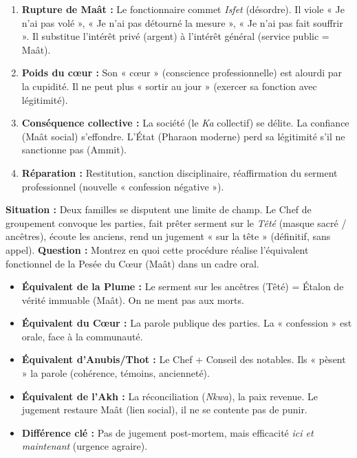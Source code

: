 \documentclass[11pt]{article}
\begin{document}
\begin{corrige}[Exercice 1]
\begin{enumerate}
    \item \textbf{Rupture de Maât :} Le fonctionnaire commet \textit{Isfet} (désordre). Il viole « Je n'ai pas volé », « Je n'ai pas détourné la mesure », « Je n'ai pas fait souffrir ». Il substitue l'intérêt privé (argent) à l'intérêt général (service public = Maât).
    \item \textbf{Poids du cœur :} Son « cœur » (conscience professionnelle) est alourdi par la cupidité. Il ne peut plus « sortir au jour » (exercer sa fonction avec légitimité).
    \item \textbf{Conséquence collective :} La société (le \textit{Ka} collectif) se délite. La confiance (Maât social) s'effondre. L'État (Pharaon moderne) perd sa légitimité s'il ne sanctionne pas (Ammit).
    \item \textbf{Réparation :} Restitution, sanction disciplinaire, réaffirmation du serment professionnel (nouvelle « confession négative »).
\end{enumerate}
\end{corrige}

\begin{exercice}
\textbf{Situation :} Deux familles se disputent une limite de champ. Le Chef de groupement convoque les parties, fait prêter serment sur le \textit{Têté} (masque sacré / ancêtres), écoute les anciens, rend un jugement « sur la tête » (définitif, sans appel).
\textbf{Question :} Montrez en quoi cette procédure réalise l'équivalent fonctionnel de la Pesée du Cœur (Maât) dans un cadre oral.
\end{exercice}

\begin{corrige}[Exercice 2]
\begin{itemize}
    \item \textbf{Équivalent de la Plume :} Le serment sur les ancêtres (Têté) = Étalon de vérité immuable (Maât). On ne ment pas aux morts.
    \item \textbf{Équivalent du Cœur :} La parole publique des parties. La « confession » est orale, face à la communauté.
    \item \textbf{Équivalent d'Anubis/Thot :} Le Chef + Conseil des notables. Ils « pèsent » la parole (cohérence, témoins, ancienneté).
    \item \textbf{Équivalent de l'Akh :} La réconciliation (\textit{Nkwa}), la paix revenue. Le jugement restaure Maât (lien social), il ne se contente pas de punir.
    \item \textbf{Différence clé :} Pas de jugement post-mortem, mais efficacité \emph{ici et maintenant} (urgence agraire).
\end{itemize}
\end{corrige}
\end{document}
